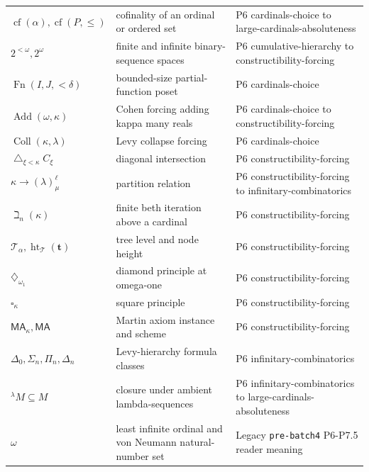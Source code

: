 \begin{longtable}{@{}p{}p{}p{}@{}}
\(\operatorname{cf}(\alpha),\allowbreak \operatorname{cf}(P,\allowbreak \leq)\) & cofinality of an ordinal or ordered set & P6 cardinals-\allowbreak{}choice to large-\allowbreak{}cardinals-\allowbreak{}absoluteness \\
\(2^{<\omega},\allowbreak 2^\omega\) & finite and infinite binary-sequence spaces & P6 cumulative-\allowbreak{}hierarchy to constructibility-\allowbreak{}forcing \\
\(\operatorname{Fn}(I,\allowbreak J,\allowbreak {<}\delta)\) & bounded-size partial-function poset & P6 cardinals-\allowbreak{}choice \\
\(\operatorname{Add}(\omega,\allowbreak \kappa)\) & Cohen forcing adding kappa many reals & P6 cardinals-\allowbreak{}choice to constructibility-\allowbreak{}forcing \\
\(\operatorname{Coll}(\kappa,\allowbreak \lambda)\) & Levy collapse forcing & P6 cardinals-\allowbreak{}choice \\
\(\mathop{\triangle}_{\xi<\kappa}C_\xi\) & diagonal intersection & P6 constructibility-\allowbreak{}forcing \\
\(\kappa\longrightarrow(\lambda)^\ell_\mu\) & partition relation & P6 constructibility-\allowbreak{}forcing to infinitary-\allowbreak{}combinatorics \\
\(\beth_n(\kappa)\) & finite beth iteration above a cardinal & P6 constructibility-\allowbreak{}forcing \\
\(\mathcal T_\alpha,\allowbreak \operatorname{ht}_{\mathcal T}(\mathbf t)\) & tree level and node height & P6 constructibility-\allowbreak{}forcing \\
\(\diamondsuit_{\omega_1}\) & diamond principle at omega-one & P6 constructibility-\allowbreak{}forcing \\
\(\square_\kappa\) & square principle & P6 constructibility-\allowbreak{}forcing \\
\(\mathsf{MA}_\kappa,\allowbreak \mathsf{MA}\) & Martin axiom instance and scheme & P6 constructibility-\allowbreak{}forcing \\
\(\Delta_0,\allowbreak \Sigma_n,\allowbreak \Pi_n,\allowbreak \Delta_n\) & Levy-hierarchy formula classes & P6 infinitary-\allowbreak{}combinatorics \\
\({}^{\lambda}M\subseteq M\) & closure under ambient lambda-sequences & P6 infinitary-\allowbreak{}combinatorics to large-\allowbreak{}cardinals-\allowbreak{}absoluteness \\
\(\omega\) & least infinite ordinal and von Neumann natural-number set & Legacy \texttt{pre-\allowbreak{}batch4} P6-\allowbreak{}P7.\allowbreak{}5 reader meaning \\

\end{longtable}
